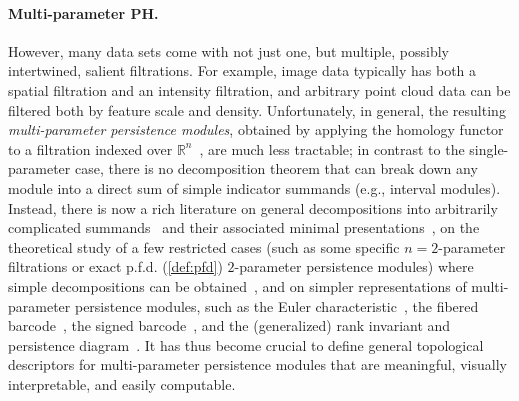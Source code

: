 \documentclass{article}
\newcommand{\R}{\mathbb{R}}
\newcommand{\rebuttal}[1]{{ #1}}
\begin{document}
\paragraph*{Multi-parameter PH.} 
However, many data sets come with not just one, but multiple, possibly intertwined,
salient filtrations.  For example, 
image data typically has both a spatial filtration and an intensity filtration, and arbitrary point cloud 
data can be filtered both by feature scale and density.  
Unfortunately, in general, the resulting {\em multi-parameter persistence modules}, obtained by applying the 
homology functor to a filtration indexed over $\R^n$~\cite{botnanIntroductionMultiparameterPersistence2023}, are much 
less tractable; in contrast to the single-parameter case, there is no decomposition theorem that can break down any module into 
a direct sum of simple indicator summands (e.g., interval modules).
Instead, there is now a rich literature on general decompositions into arbitrarily complicated summands~\cite{deyGeneralizedPersistenceAlgorithm2022, deyDecomposingMultiparameterPersistence2025} and their associated minimal presentations~\cite{fugacciChunkReductionMultiParameter2019, kerberFastMinimalPresentations2021, lesnickComputingMinimalPresentations2022}, 
on the theoretical study of a few restricted cases (such as \rebuttal{some specific} $n=2$-parameter filtrations or \rebuttal{exact p.f.d. (\cref{def:pfd}) $2$-parameter persistence modules}) where simple 
decompositions can be obtained~\cite{cochoyDecompositionExactPFD2020,
		botnanRectangleDecomposable2ParameterPersistence2022, 
        asashibaIntervalDecomposability2D2022,
        botnanLocalCharacterizationsDecomposability2023,
        leboviciLocalCharacterizationBlockdecomposability2024},
\rebuttal{and on simpler representations of multi-parameter persistence modules, such as the Euler characteristic}~\cite{hacquardEulerCharacteristicTools2024}, \rebuttal{the fibered barcode}~\cite{corbetKernelMultiparameterPersistent2019, vipondMultiparameterPersistenceLandscapes2020}, \rebuttal{the signed barcode}~\cite{botnanSignedBarcodesMultiparameter2024, loiseauxStableVectorizationMultiparameter2023}, \rebuttal{and the (generalized) rank invariant and persistence diagram}~\cite{kimGeneralizedPersistenceDiagrams2021, xinGRIL2parameterPersistence2023}. 
It has thus become crucial to define general topological \rebuttal{descriptors} for multi-parameter persistence modules that
are meaningful, visually interpretable, and easily computable.
\end{document}
